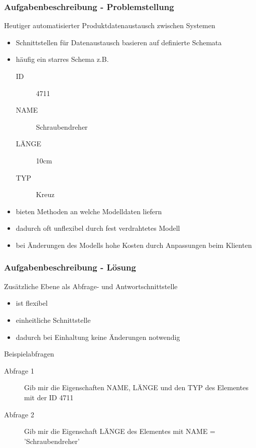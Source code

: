 \documentclass[serif,mathserif]{beamer}
\begin{document}
\begin{frame}
  \frametitle{Aufgabenbeschreibung - Problemstellung}
  Heutiger automatisierter Produktdatenaustausch zwischen Systemen
  \begin{itemize}
  \item Schnittstellen für Datenaustausch basieren auf definierte Schemata
  \item häufig ein starres Schema z.B. 
      \begin{description}
      \item[ID] 4711
      \item[NAME] Schraubendreher
      \item[LÄNGE] 10cm 
      \item[TYP] Kreuz 
      \end{description}
  \item bieten Methoden an welche Modelldaten liefern
  \item dadurch oft unflexibel durch fest verdrahtetes Modell 
  \item bei Änderungen des Modells hohe Kosten durch Anpassungen beim Klienten
  \end{itemize}
\end{frame}


\begin{frame}
  \frametitle{Aufgabenbeschreibung - Lösung}
  Zusätzliche Ebene als Abfrage- und Antwortschnittstelle
  \begin{itemize}
  \item ist flexibel
  \item einheitliche Schnittstelle
  \item dadurch bei Einhaltung keine Änderungen notwendig
  \end{itemize}
  Beispielabfragen
      \begin{description}
      \item[Abfrage 1] Gib mir die Eigenschaften NAME, LÄNGE und den TYP des Elementes mit der ID 4711
      \item[Abfrage 2] Gib mir die Eigenschaft LÄNGE des Elementes mit NAME = 'Schraubendreher'
      \end{description}
\end{frame}
\end{document}
